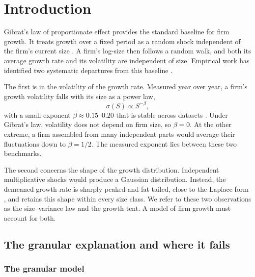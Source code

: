 \chapter{Introduction}
\label{chap:intro}

Gibrat's law of proportionate effect provides the standard baseline for firm growth. It treats
growth over a fixed period as a random shock independent of the firm's current size
\citep{gibrat1931}. A firm's log-size then follows a random walk, and both its average growth
rate and its volatility are independent of size. Empirical work has identified two systematic
departures from this baseline \citep{sutton1997}.

The first is in the volatility of the growth rate. Measured year over year,
a firm's growth volatility falls with its size as a power law,
\begin{equation}
  \sigma(S) \propto S^{-\beta},
  \label{eq:intro-sizevar}
\end{equation}
with a small exponent $\beta \approx 0.15$--$0.20$ that is stable across datasets
\citep{stanley1996, amaral1997}. Under Gibrat's law, volatility does not depend on firm size,
so $\beta = 0$. At the other extreme, a firm assembled from many independent parts would
average their fluctuations down to $\beta = 1/2$. The measured exponent lies between these
two benchmarks.

The second concerns the shape of the growth distribution. Independent multiplicative shocks would
produce a Gaussian distribution. Instead, the demeaned growth rate is sharply peaked and
fat-tailed, close to the Laplace form \citep{stanley1996, bottazzi2006}, and retains this shape
within every size class. We refer to these two observations as the size--variance law and the
growth tent. A model of firm growth must account for both.

\section{The granular explanation and where it fails}
\label{sec:intro-granular}

\subsection{The granular model}
\label{sec:intro-granular-model}

